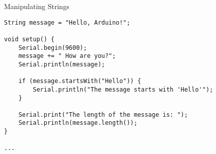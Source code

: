 \documentclass[sectionframe]{oxblue-beamer}
\begin{document}
\begin{frame}[fragile]{Manipulating Strings}
\begin{verbatim}
String message = "Hello, Arduino!";

void setup() {
    Serial.begin(9600);
    message += " How are you?";
    Serial.println(message);

    if (message.startsWith("Hello")) {
        Serial.println("The message starts with 'Hello'");
    }

    Serial.print("The length of the message is: ");
    Serial.println(message.length());
}

...
\end{verbatim}
\end{frame}

\end{document}

